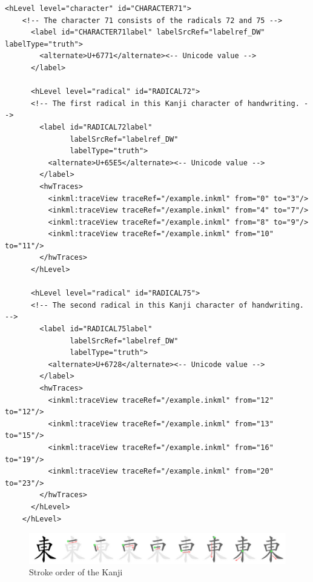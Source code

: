 \begin{xmlcode}
  \begin{lstlisting}[emph={hLevel,hwTraces,label,alternative},
                     emphstyle=\color{blue}\textbf,
                     emph={[2]id,level,labelSrcRef,labelType,traceRef,from,to},
                     emphstyle={[2]\color{red}},
                     caption={A character representation in UPX},
                     label=lst:charaterdataformat]
    <hLevel level="character" id="CHARACTER71">
    <!-- The character 71 consists of the radicals 72 and 75 -->
      <label id="CHARACTER71label" labelSrcRef="labelref_DW" labelType="truth">
        <alternate>U+6771</alternate><-- Unicode value -->
      </label>

      <hLevel level="radical" id="RADICAL72">
      <!-- The first radical in this Kanji character of handwriting. -->
        <label id="RADICAL72label" 
               labelSrcRef="labelref_DW" 
               labelType="truth">
          <alternate>U+65E5</alternate><-- Unicode value -->
        </label>
        <hwTraces>
          <inkml:traceView traceRef="/example.inkml" from="0" to="3"/>
          <inkml:traceView traceRef="/example.inkml" from="4" to="7"/>
          <inkml:traceView traceRef="/example.inkml" from="8" to="9"/>
          <inkml:traceView traceRef="/example.inkml" from="10" to="11"/>
        </hwTraces>
      </hLevel>

      <hLevel level="radical" id="RADICAL75">
      <!-- The second radical in this Kanji character of handwriting. -->
        <label id="RADICAL75label" 
               labelSrcRef="labelref_DW" 
               labelType="truth">
          <alternate>U+6728</alternate><-- Unicode value -->
        </label>
        <hwTraces>
          <inkml:traceView traceRef="/example.inkml" from="12" to="12"/>
          <inkml:traceView traceRef="/example.inkml" from="13" to="15"/>
          <inkml:traceView traceRef="/example.inkml" from="16" to="19"/>
          <inkml:traceView traceRef="/example.inkml" from="20" to="23"/>
        </hwTraces>
      </hLevel>
    </hLevel>
  \end{lstlisting}
\end{xmlcode}

\begin{figure}[htbp]
  \begin{center}
    \includegraphics[scale=1.75]{images/radicalStructure/EAST-strokeorder.png}
    \caption{Stroke order of the Kanji }
    \label{fig:strokeorderofEAST}
  \end{center}
\end{figure}

